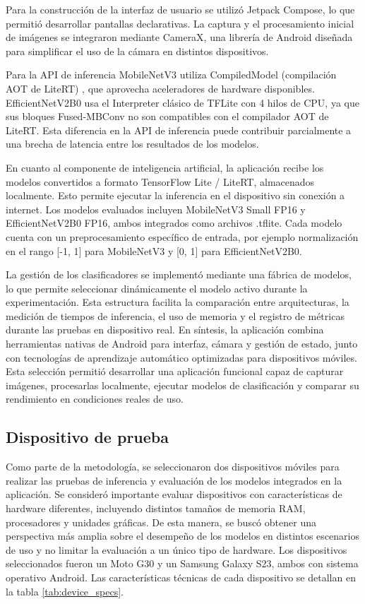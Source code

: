 Para la construcción de la interfaz de usuario se utilizó Jetpack Compose, lo que permitió desarrollar pantallas declarativas. 
La captura y el procesamiento inicial de imágenes se integraron mediante
CameraX, una librería de Android diseñada para simplificar el uso de la cámara en distintos dispositivos.

Para la API de inferencia  MobileNetV3 utiliza CompiledModel (compilación AOT de LiteRT) \cite{google2026litert}, que aprovecha aceleradores de hardware disponibles. 
EfficientNetV2B0 usa el Interpreter clásico de TFLite con 4 hilos de CPU, ya que sus bloques Fused-MBConv no son compatibles con el compilador AOT de LiteRT.
Esta diferencia en la API de inferencia puede contribuir parcialmente a una brecha de latencia entre los resultados de los modelos.

En cuanto al componente de inteligencia artificial, la aplicación recibe los modelos convertidos a formato TensorFlow Lite / LiteRT,
almacenados localmente. Esto permite ejecutar la inferencia en el dispositivo sin conexión a
internet. Los modelos evaluados incluyen MobileNetV3 Small FP16 y EfficientNetV2B0 FP16, ambos integrados como archivos .tflite. Cada
modelo cuenta con un preprocesamiento específico de entrada, por ejemplo normalización en el rango [-1, 1] para MobileNetV3 y [0, 1]
para EfficientNetV2B0.

La gestión de los clasificadores se implementó mediante una fábrica de modelos, lo que permite seleccionar dinámicamente el modelo activo
durante la experimentación. Esta estructura facilita la comparación entre arquitecturas, la medición de tiempos de inferencia, el uso de
memoria y el registro de métricas durante las pruebas en dispositivo real. En síntesis, la aplicación combina herramientas nativas de
Android para interfaz, cámara y gestión de estado, junto con tecnologías de aprendizaje automático optimizadas para dispositivos móviles.
Esta selección permitió desarrollar una aplicación funcional capaz de capturar imágenes, procesarlas localmente, ejecutar modelos de
clasificación y comparar su rendimiento en condiciones reales de uso.

\subsection{Dispositivo de prueba}
Como parte de la metodología, se seleccionaron dos dispositivos móviles para realizar las pruebas de inferencia y evaluación de los
modelos integrados en la aplicación. Se consideró importante evaluar dispositivos con características de hardware diferentes, incluyendo
distintos tamaños de memoria RAM, procesadores y unidades gráficas. De esta manera, se buscó obtener una perspectiva más amplia sobre
el desempeño de los modelos en distintos escenarios de uso y no limitar la evaluación a un único tipo de hardware. Los dispositivos
seleccionados fueron un Moto G30 y un Samsung Galaxy S23, ambos con sistema operativo Android. Las características técnicas de cada
dispositivo se detallan en la tabla \ref{tab:device_specs}.

